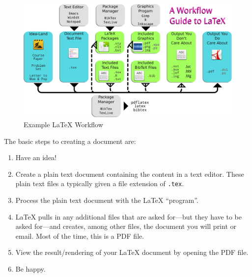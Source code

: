 \begin{figure}
  \caption{Example \LaTeX{} Workflow}
  \label{fig:workflow}
  \begin{center}
    \includegraphics[scale=.5,angle=90]{./Extra_Materials/workflow.pdf}

  \end{center}
\end{figure}


The basic steps to creating a document are:
\begin{enumerate}
\item Have an idea!

\item Create a plain text document containing the content in a text
  editor. These plain text files a typically given a file extension of
  \verb=.tex=.

\item Process the plain text document with the \LaTeX{} ``program''.

\item \LaTeX{} pulls in any additional files that are asked for---but they have
  to be asked for---and creates, among other files, the document you will print
  or email. Most of the time, this is a PDF file.

\item View the result/rendering of your \LaTeX{} document by opening the PDF
  file.

\item Be happy.

\end{enumerate}

